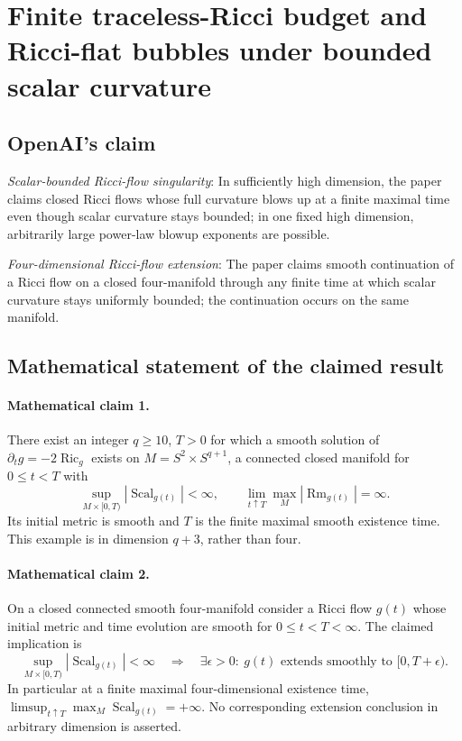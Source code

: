 \documentclass[11pt]{article}
\begin{document}
\section*{Finite traceless-Ricci budget and Ricci-flat bubbles under bounded scalar curvature}

\subsection{OpenAI's claim}
\textit{Scalar-bounded Ricci-flow singularity}: In sufficiently high dimension, the paper claims closed Ricci flows whose full curvature blows up at a finite maximal time even though scalar curvature stays bounded; in one fixed high dimension, arbitrarily large power-law blowup exponents are possible.

\textit{Four-dimensional Ricci-flow extension}: The paper claims smooth continuation of a Ricci flow on a closed four-manifold through any finite time at which scalar curvature stays uniformly bounded; the continuation occurs on the same manifold.

\subsection{Mathematical statement of the claimed result}
\paragraph{Mathematical claim 1.} There exist an integer $q\ge10$, $T>0$ for which a smooth solution of $\partial_tg=-2\operatorname{Ric}_g$ exists on $M=S^2\times S^{q+1}$, a connected closed manifold for $0\le t<T$ with \[\sup_{M\times[0,T)}|\operatorname{Scal}_{g(t)}|<\infty,\qquad\lim_{t\uparrow T}\max_M|\operatorname{Rm}_{g(t)}|=\infty.\] Its initial metric is smooth and $T$ is the finite maximal smooth existence time. This example is in dimension $q+3$, rather than four.

\paragraph{Mathematical claim 2.} On a closed connected smooth four-manifold consider a Ricci flow $g(t)$ whose initial metric and time evolution are smooth for $0\le t<T<\infty$. The claimed implication is \[\sup_{M\times[0,T)}|\operatorname{Scal}_{g(t)}|<\infty\quad\Longrightarrow\quad\exists\epsilon>0:\ g(t)\text{ extends smoothly to }[0,T+\epsilon).\] In particular at a finite maximal four-dimensional existence time, $\limsup_{t\uparrow T}\max_M\operatorname{Scal}_{g(t)}=+\infty$. No corresponding extension conclusion in arbitrary dimension is asserted.
\end{document}
